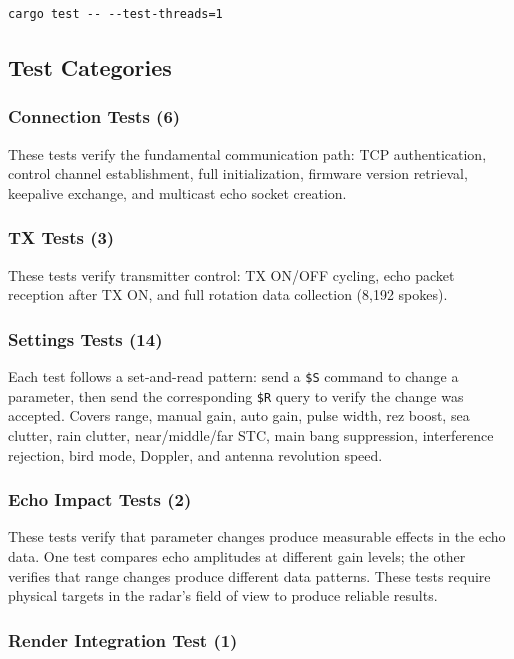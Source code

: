 \documentclass[11pt,letterpaper]{article}
\begin{document}
\begin{lstlisting}
cargo test -- --test-threads=1
\end{lstlisting}

\subsection{Test Categories}

\subsubsection{Connection Tests (6)}

These tests verify the fundamental communication path: TCP authentication, control channel establishment, full initialization, firmware version retrieval, keepalive exchange, and multicast echo socket creation.

\subsubsection{TX Tests (3)}

These tests verify transmitter control: TX ON/OFF cycling, echo packet reception after TX ON, and full rotation data collection (8{,}192 spokes).

\subsubsection{Settings Tests (14)}

Each test follows a set-and-read pattern: send a \texttt{\$S} command to change a parameter, then send the corresponding \texttt{\$R} query to verify the change was accepted. Covers range, manual gain, auto gain, pulse width, rez boost, sea clutter, rain clutter, near/middle/far STC, main bang suppression, interference rejection, bird mode, Doppler, and antenna revolution speed.

\subsubsection{Echo Impact Tests (2)}

These tests verify that parameter changes produce measurable effects in the echo data. One test compares echo amplitudes at different gain levels; the other verifies that range changes produce different data patterns. These tests require physical targets in the radar's field of view to produce reliable results.

\subsubsection{Render Integration Test (1)}
\end{document}
